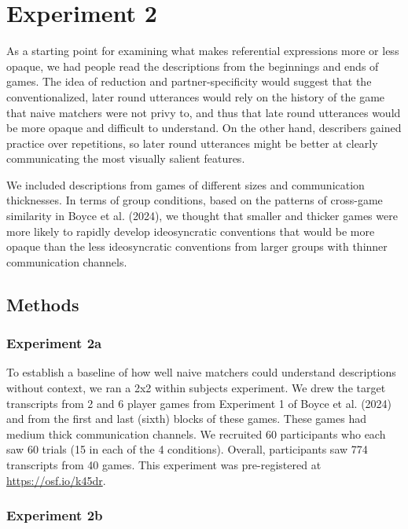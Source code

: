 \documentclass[10pt, letterpaper]{article}
\begin{document}
\section{Experiment 2}\label{experiment-2}

As a starting point for examining what makes referential expressions
more or less opaque, we had people read the descriptions from the
beginnings and ends of games. The idea of reduction and
partner-specificity would suggest that the conventionalized, later round
utterances would rely on the history of the game that naive matchers
were not privy to, and thus that late round utterances would be more
opaque and difficult to understand. On the other hand, describers gained
practice over repetitions, so later round utterances might be better at
clearly communicating the most visually salient features.

We included descriptions from games of different sizes and communication
thicknesses. In terms of group conditions, based on the patterns of
cross-game similarity in Boyce et al. (2024), we thought that smaller
and thicker games were more likely to rapidly develop ideosyncratic
conventions that would be more opaque than the less ideosyncratic
conventions from larger groups with thinner communication channels.

\subsection{Methods}\label{methods-1}

\subsubsection{Experiment 2a}\label{experiment-2a}

To establish a baseline of how well naive matchers could understand
descriptions without context, we ran a 2x2 within subjects experiment.
We drew the target transcripts from 2 and 6 player games from Experiment
1 of Boyce et al. (2024) and from the first and last (sixth) blocks of
these games. These games had medium thick communication channels. We
recruited 60 participants who each saw 60 trials (15 in each of the 4
conditions). Overall, participants saw 774 transcripts from 40 games.
This experiment was pre-registered at \url{https://osf.io/k45dr}.

\subsubsection{Experiment 2b}\label{experiment-2b}
\end{document}
